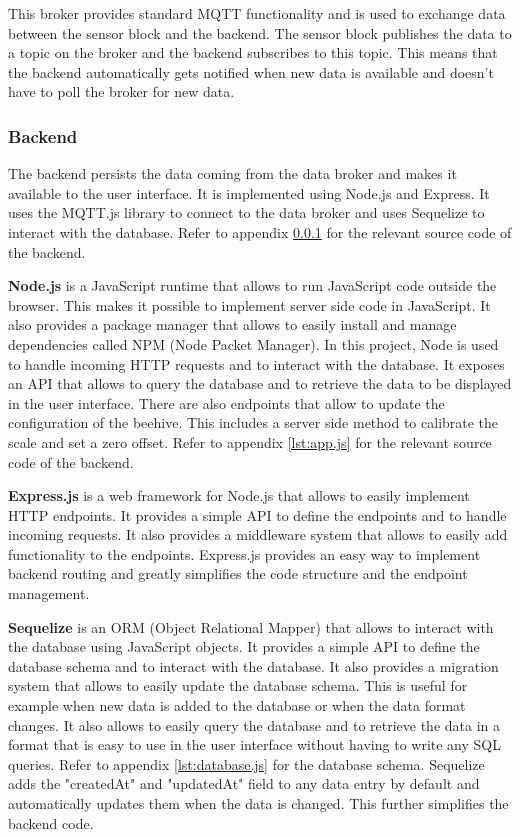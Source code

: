 This broker provides standard MQTT functionality and is used to exchange data between the sensor block and the backend. The sensor block publishes the data to a topic on the broker and the backend subscribes to this topic. This means that the backend automatically gets notified when new data is available and doesn't have to poll the broker for new data.

\subsubsection {Backend} \label{sec:backend}
The backend persists the data coming from the data broker and makes it available to the user interface. It is implemented using Node.js and Express. It uses the MQTT.js library to connect to the data broker and uses Sequelize to interact with the database. Refer to appendix \ref{sec:backend} for the relevant source code of the backend.

\textbf{Node.js} is a JavaScript runtime that allows to run JavaScript code outside the browser. This makes it possible to implement server side code in JavaScript. It also provides a package manager that allows to easily install and manage dependencies called NPM (Node Packet Manager). In this project, Node is used to handle incoming HTTP requests and to interact with the database. 
It exposes an API that allows to query the database and to retrieve the data to be displayed in the user interface. There are also endpoints that allow to update the configuration of the beehive. This includes a server side method to calibrate the scale and set a zero offset. Refer to appendix \ref{lst:app.js} for the relevant source code of the backend.

\textbf{Express.js} is a web framework for Node.js that allows to easily implement HTTP endpoints. It provides a simple API to define the endpoints and to handle incoming requests. It also provides a middleware system that allows to easily add functionality to the endpoints. Express.js provides an easy way to implement backend routing and greatly simplifies the code structure and the endpoint management.

\textbf{Sequelize} is an ORM (Object Relational Mapper) that allows to interact with the database using JavaScript objects. It provides a simple API to define the database schema and to interact with the database. It also provides a migration system that allows to easily update the database schema. This is useful for example when new data is added to the database or when the data format changes. It also allows to easily query the database and to retrieve the data in a format that is easy to use in the user interface without having to write any SQL queries. Refer to appendix \ref{lst:database.js} for the database schema.
Sequelize adds the "createdAt" and "updatedAt" field to any data entry by default and automatically updates them when the data is changed. This further simplifies the backend code.

